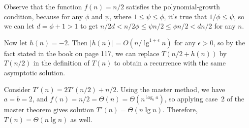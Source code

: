 Observe that the function $f(n)=n/2$ satisfies the polynomial-growth condition, because for any $\phi$ and $\psi$, where $1\le\psi\le\phi$, it's true that $1/\phi\le\psi$, so we can let $d=\phi+1>1$ to get $n/2d<n/2\phi\le\psi n/2\le\phi n/2<dn/2$ for any $n$.

Now let $h(n)=-2$.
Then $|h(n)|=O(n/\lg^{1+\epsilon}n)$ for any $\epsilon>0$, so by the fact stated in the book on page 117, we can replace $T(n/2+h(n))$ by $T(n/2)$ in the definition of $T(n)$ to obtain a recurrence with the same asymptotic solution.

Consider $T'(n)=2T'(n/2)+n/2$.
Using the master method, we have $a=b=2$, and $f(n)=n/2=\Theta(n)=\Theta(n^{\log_ba})$, so applying case~2 of the master theorem gives solution $T'(n)=\Theta(n\lg n)$.
Therefore, $T(n)=\Theta(n\lg n)$ as well.
